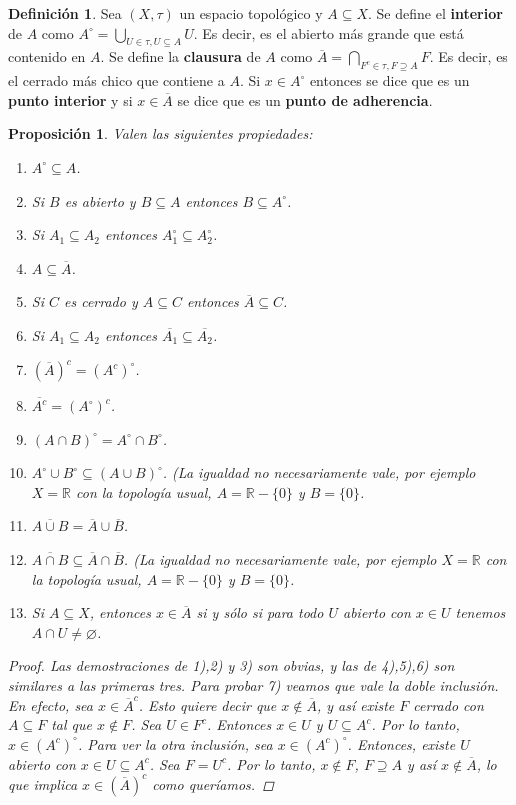 \documentclass[12pt]{book}
\newtheorem{prop}[teo]{Proposición}
\theoremstyle{definition}
\newtheorem{defn}[teo]{Definición}
\newcommand{\RR}{\mathbb{R}}      %
\let\emptyset\varnothing
\begin{document}
\begin{defn}
Sea $(X,\tau)$ un espacio topológico y $A\subseteq X$. Se define el \textbf{interior} de $A$ como $A^\circ = \displaystyle\bigcup_{U\in \tau, U\subseteq A} U$. Es decir, es el abierto más grande que está contenido en $A$. Se define la \textbf{clausura} de $A$ como $\overline{A}=\displaystyle\bigcap_{F^c\in \tau, F\supseteq A} F$. Es decir, es el cerrado más chico que contiene a $A$. Si $x\in A^\circ$ entonces se dice que es un \textbf{punto interior} y si $x\in \overline{A}$ se dice que es un \textbf{punto de adherencia}.
\end{defn}

\begin{prop}
Valen las siguientes propiedades:
\begin{enumerate}
\item $A^\circ \subseteq A$.
\item Si $B$ es abierto y $B\subseteq A$ entonces $B\subseteq A^\circ$.
\item Si $A_1\subseteq A_2$ entonces $A_1^\circ \subseteq A_2^\circ$.
\item $A\subseteq \overline{A}$.
\item Si $C$ es cerrado y $A\subseteq C$ entonces $\overline{A}\subseteq C$.
\item Si $A_1\subseteq A_2$ entonces $\overline{A_1}\subseteq \overline{A_2}$.
\item $(\overline{A})^c = (A^c)^\circ$.
\item $\overline{A^c} = (A^\circ)^c$.
\item $(A\cap B)^\circ = A^\circ \cap B^\circ$.
\item $A^\circ \cup B^\circ \subseteq (A\cup B)^\circ$. (La igualdad no necesariamente vale, por ejemplo $X=\RR$ con la topología usual, $A=\RR-\{0\}$ y $B=\{0\}$.
\item $\overline{A\cup B} = \overline{A}\cup \overline{B}$.
\item $\overline{A\cap B}\subseteq \overline{A}\cap\overline{B}$. (La igualdad no necesariamente vale, por ejemplo $X=\RR$ con la topología usual, $A=\RR-\{0\}$ y $B=\{0\}$.
\item Si $A\subseteq X$, entonces $x\in \overline{A}$ si y sólo si para todo $U$ abierto con $x\in U$ tenemos $A\cap U\neq \emptyset$.
\end{enumerate}
\begin{proof}

Las demostraciones de 1),2) y 3) son obvias, y las de 4),5),6) son similares a las primeras tres. Para probar 7) veamos que vale la doble inclusión. En efecto, sea $x\in \overline{A}^c$. Esto quiere decir que $x\notin \overline{A}$, y así existe $F$ cerrado con $A\subseteq F$ tal que $x\notin F$. Sea $U\in F^c$. Entonces $x\in U$ y $U\subseteq A^c$. Por lo tanto, $x\in (A^c)^\circ$. Para ver la otra inclusión, sea $x\in (A^c)^\circ$. Entonces, existe $U$ abierto con $x\in U\subseteq A^c$. Sea $F=U^c$. Por lo tanto, $x\notin F$, $F\supseteq A$ y así $x\notin \overline{A}$, lo que implica $x\in (\overline{A})^c$ como queríamos.


\end{proof}
\end{prop}
\end{document}
